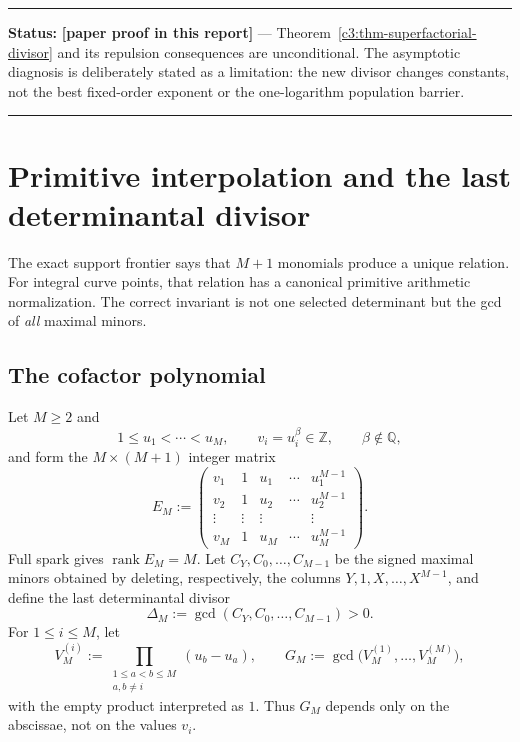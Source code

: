 \documentclass[11pt,oneside]{article}
\theoremstyle{definition}
\theoremstyle{remark}
\newcommand{\Z}{\mathbb Z}
\newcommand{\Q}{\mathbb Q}
\newcommand{\statusnew}{\textcolor{newgreen}{\textbf{[paper proof in this report]}}}
\newcommand{\rank}{\operatorname{rank}}
\newenvironment{statusbox}[1]
{\begin{center}\begin{minipage}{0.94\textwidth}\raggedright\hbadness=10000\hrule
\vspace{0.45em}\textbf{Status:} #1\par\vspace{0.35em}}
{\vspace{0.35em}\hrule\end{minipage}\end{center}}
\begin{document}
\begin{statusbox}{\statusnew{} --- Theorem~\ref{c3:thm-superfactorial-divisor} and its
repulsion consequences are unconditional.  The asymptotic diagnosis is deliberately stated
as a limitation: the new divisor changes constants, not the best fixed-order exponent or the
one-logarithm population barrier.}
\end{statusbox}

\section{Primitive interpolation and the last determinantal divisor}
\label{sec:smithinterp}

The exact support frontier says that $M+1$ monomials produce a unique relation.  For integral
curve points, that relation has a canonical primitive arithmetic normalization.  The correct
invariant is not one selected determinant but the gcd of \emph{all} maximal minors.

\subsection{The cofactor polynomial}

Let $M\ge2$ and
\[
 1\le u_1<\cdots<u_M,
 \qquad
 v_i=u_i^\beta\in\Z,
 \qquad
 \beta\notin\Q,
\]
and form the $M\times(M+1)$ integer matrix
\begin{equation}
 E_M:=
 \begin{pmatrix}
  v_1&1&u_1&\cdots&u_1^{M-1}\\
  v_2&1&u_2&\cdots&u_2^{M-1}\\
  \vdots&\vdots&\vdots&&\vdots\\
  v_M&1&u_M&\cdots&u_M^{M-1}
 \end{pmatrix}.
 \label{c3:eq-EM}
\end{equation}
Full spark gives $\rank E_M=M$.  Let $C_Y,C_0,\ldots,C_{M-1}$ be the signed maximal minors obtained by deleting,
respectively, the columns $Y,1,X,\ldots,X^{M-1}$, and define the last determinantal
divisor
\begin{equation}
 \Delta_M:=\gcd(C_Y,C_0,\ldots,C_{M-1})>0.
 \label{c3:eq-DeltaM}
\end{equation}
For $1\le i\le M$, let
\[
 V_M^{(i)}:=\prod_{\substack{1\le a<b\le M\\a,b\ne i}}(u_b-u_a),
 \qquad
 G_M:=\gcd\bigl(V_M^{(1)},\ldots,V_M^{(M)}\bigr),
\]
with the empty product interpreted as $1$.  Thus $G_M$ depends only on the abscissae, not on
the values $v_i$.
\end{document}
